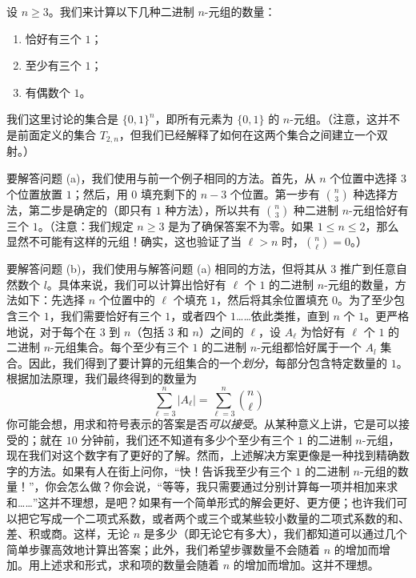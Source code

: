 \begin{example}
    设 $n \ge 3$。我们来计算以下几种二进制 $n$-元组的数量：
    \begin{enumerate}[label=(\alph*)]
        \item 恰好有三个 $1$；
        \item 至少有三个 $1$；
        \item 有偶数个 $1$。
    \end{enumerate}

    我们这里讨论的集合是 $\{0, 1\}^n$，即所有元素为 $\{0, 1\}$ 的 $n$-元组。（注意，这并不是前面定义的集合 $T_{2,n}$，但我们已经解释了如何在这两个集合之间建立一个双射。）

    要解答问题 (a)，我们使用与前一个例子相同的方法。首先，从 $n$ 个位置中选择 $3$ 个位置放置 $1$；然后，用 $0$ 填充剩下的 $n-3$ 个位置。第一步有 ${n \choose 3}$ 种选择方法，第二步是确定的（即只有 $1$ 种方法），所以共有 ${n \choose 3}$ 种二进制 $n$-元组恰好有三个 $1$。（注意：我们规定 $n \ge 3$ 是为了确保答案不为零。如果 $1 \le n \le 2$，那么显然不可能有这样的元组！确实，这也验证了当 $\ell > n$ 时，${n \choose \ell} = 0$。）

    要解答问题 (b)，我们使用与解答问题 (a) 相同的方法，但将其从 $3$ 推广到任意自然数个 $l$。具体来说，我们可以计算出恰好有 $\ell$ 个 $1$ 的二进制 $n$-元组的数量，方法如下：先选择 $n$ 个位置中的 $\ell$ 个填充 $1$，然后将其余位置填充 $0$。为了至少包含三个 $1$，我们需要恰好有三个 $1$，或者四个 $1$……依此类推，直到 $n$ 个 $1$。更严格地说，对于每个在 $3$ 到 $n$（包括 $3$ 和 $n$）之间的 $\ell$，设 $A_\ell$ 为恰好有 $\ell$ 个 $1$ 的二进制 $n$-元组集合。每个至少有三个 $1$ 的二进制 $n$-元组都恰好属于一个 $A_l$ 集合。因此，我们得到了要计算的元组集合的一个\emph{划分}，每部分包含特定数量的 $1$。根据加法原理，我们最终得到的数量为
    \[\sum_{\ell = 3}^{n} |A_\ell| = \sum_{\ell = 3}^{n} {n \choose \ell}\]
    你可能会想，用求和符号表示的答案是否\emph{可以接受}。从某种意义上讲，它是可以接受的；就在 $10$ 分钟前，我们还不知道有多少个至少有三个 $1$ 的二进制 $n$-元组，现在我们对这个数字有了更好的了解。然而，上述解决方案更像是一种找到精确数字的方法。如果有人在街上问你，``快！告诉我至少有三个 $1$ 的二进制 $n$-元组的数量！''，你会怎么做？你会说，``等等，我只需要通过分别计算每一项并相加来求和……''这并不理想，是吧？如果有一个简单形式的解会更好、更方便；也许我们可以把它写成一个二项式系数，或者两个或三个或某些较小数量的二项式系数的和、差、积或商。这样，无论 $n$ 是多少（即无论它有多大），我们都知道可以通过几个简单步骤高效地计算出答案；此外，我们希望步骤数量不会随着 $n$ 的增加而增加。用上述求和形式，求和项的数量会随着 $n$ 的增加而增加。这并不理想。


\end{example}
